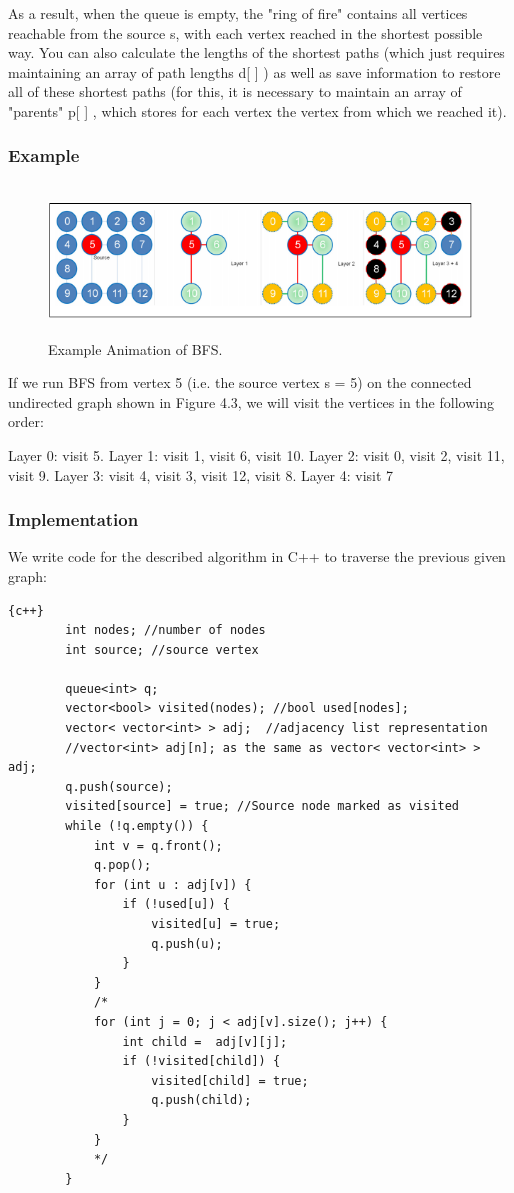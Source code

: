 \hspace{7mm}As a result, when the queue is empty, the "ring of fire" contains all vertices reachable from the source s, with each vertex reached in the shortest possible way. You can also calculate the lengths of the shortest paths (which just requires maintaining an array of path lengths d[ ] ) as well as save information to restore all of these shortest paths (for this, it is necessary to maintain an array of "parents" p[ ] , which stores for each vertex the vertex from which we reached it).   
\subsubsection{Example}
\begin{figure}[h]
    \centering
\includegraphics[width=16cm, height=4cm]{BFS-animation.png}
 \caption{Example Animation of BFS.}
    \label{fig:BFS-animation}
\end{figure}

If we run BFS from vertex 5 (i.e. the source vertex s = 5) on the connected undirected
graph shown in Figure 4.3, we will visit the vertices in the following order:

Layer 0: visit 5. Layer 1: visit 1, visit 6, visit 10. Layer 2: visit 0, visit 2, visit 11, visit 9. Layer 3: visit 4, visit 3, visit 12, visit 8. Layer 4: visit 7

\subsubsection{Implementation}
We write code for the described algorithm in C++ to traverse the previous given graph:
\begin{lstlisting}{c++}
        int nodes; //number of nodes
        int source; //source vertex
        
        queue<int> q;
        vector<bool> visited(nodes); //bool used[nodes]; 
        vector< vector<int> > adj;  //adjacency list representation
        //vector<int> adj[n]; as the same as vector< vector<int> > adj;
        q.push(source);
        visited[source] = true; //Source node marked as visited
        while (!q.empty()) {
            int v = q.front();
            q.pop();
            for (int u : adj[v]) {
                if (!used[u]) {
                    visited[u] = true;
                    q.push(u);
                }
            }
            /*
            for (int j = 0; j < adj[v].size(); j++) {
                int child =  adj[v][j];
                if (!visited[child]) {
                    visited[child] = true;
                    q.push(child);
                }
            }
            */
        }
\end{lstlisting}

